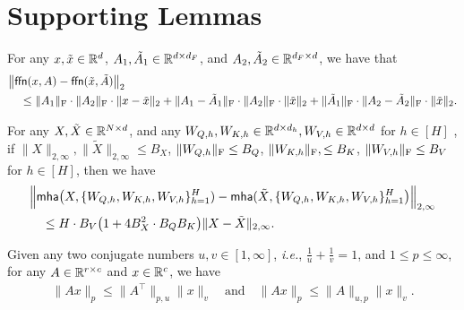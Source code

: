 \section{Supporting Lemmas}

\begin{proposition}\label{prop:fflip}
    For any $x,\tilde{x}\in\mathbb{R}^{ d}$, $A_{1},\tilde{A}_{1}\in\mathbb{R}^{d\times d_{F}}$, and $A_{2},\tilde{A}_{2}\in\mathbb{R}^{d_{F}\times d}$, we have that
    \begin{align*}
        &\big\|\mathsf{ffn}(x,A)-\mathsf{ffn}(\tilde{x},\tilde{A})\big\|_{2}\\
        &\quad\leq\|A_{1}\|_{\mathrm{F}}\cdot\|A_{2}\|_{\mathrm{F}}\cdot\|x-\tilde{x}\|_{2}+\|A_{1}-\tilde{A}_{1}\|_{\mathrm{F}}\cdot\|A_{2}\|_{\mathrm{F}}\cdot\|\tilde{x}\|_{2}+\|\tilde{A}_{1}\|_{\mathrm{F}}\cdot\|A_{2}-\tilde{A}_{2}\|_{\mathrm{F}}\cdot\|\tilde{x}\|_{2}.
    \end{align*}
\end{proposition}

\begin{lemma}\label{lem:mhalip}
    For any $X,\tilde{X}\in\mathbb{R}^{N\times d}$, and any $W_{Q,h},W_{K,h}\in\mathbb{R}^{d\times d_{h}},W_{V,h}\in\mathbb{R}^{d\times d}$ for $h\in [H]$ , if $\|X\|_{2,\infty},\|\tilde{X}\|_{2,\infty}\leq B_{X}$, $\|W_{Q,h}\|_{\mathrm{F}}\leq B_{Q}$, $\|W_{K,h}\|_{\mathrm{F}},\leq B_{K}$, $\|W_{V,h}\|_{\mathrm{F}}\leq B_{V}$ for $h\in[H]$, then we have 
    \begin{align*}
        &\Big\|\mathsf{mha}\big(X,\{W_{Q,h},W_{K,h},W_{V,h}\}_{h=1}^{H})-\mathsf{mha}(\tilde{X},\{W_{Q,h},W_{K,h},W_{V,h}\}_{h=1}^{H}\big)\Big\|_{2,\infty}\nonumber\\
        &\quad\leq H\cdot B_{V}\big(1+4B_{X}^{2}\cdot B_{Q}B_{K}\big)\|X-\tilde{X}\|_{2,\infty}.
    \end{align*}
\end{lemma}

\begin{lemma}\label{lem:matvec}
    Given any two conjugate numbers $u,v\in [1,\infty]$, \emph{i.e.}, $\frac{1}{u}+\frac{1}{v}=1$, and $1\leq p\leq \infty$, for any $A\in\mathbb{R}^{r\times c}$ and $x\in \mathbb{R}^{c}$, we have
    \begin{align}
        \|Ax\|_{p}\leq \|A^{\top}\|_{p,u}\|x\|_{v}\quad\mbox{and}\quad  \|Ax\|_{p}\leq \|A\|_{u,p}\|x\|_{v}\nonumber.
    \end{align}
\end{lemma}

